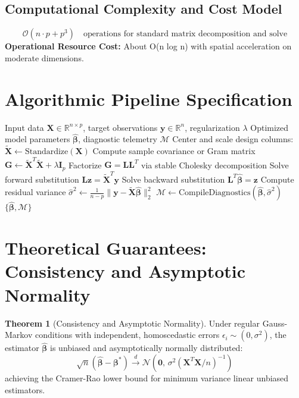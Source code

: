 \documentclass[11pt,a4paper]{article}
\theoremstyle{definition}
\newtheorem{theorem}{\textbf{Theorem}}[section]
\begin{document}
\subsection{Computational Complexity and Cost Model}
\begin{equation}
\mathcal{O}(n \cdot p + p^3) \quad \text{operations for standard matrix decomposition and solve}
\end{equation}
\textbf{Operational Resource Cost:} About O(n log n) with spatial acceleration on moderate dimensions.

\section{Algorithmic Pipeline Specification}

\begin{algorithm}[H]
\caption{HDBSCAN Execution}
\begin{algorithmic}[1]
\Require Input data $\mathbf{X} \in \mathbb{R}^{n \times p}$, target observations $\mathbf{y} \in \mathbb{R}^n$, regularization $\lambda$
\Ensure Optimized model parameters $\hat{\boldsymbol{\beta}}$, diagnostic telemetry $\mathcal{M}$
\State Center and scale design columns: $\tilde{\mathbf{X}} \gets \text{Standardize}(\mathbf{X})$
\State Compute sample covariance or Gram matrix $\mathbf{G} \gets \tilde{\mathbf{X}}^T \tilde{\mathbf{X}} + \lambda \mathbf{I}_p$
\State Factorize $\mathbf{G} = \mathbf{L} \mathbf{L}^T$ via stable Cholesky decomposition
\State Solve forward substitution $\mathbf{L} \mathbf{z} = \tilde{\mathbf{X}}^T \mathbf{y}$
\State Solve backward substitution $\mathbf{L}^T \hat{\boldsymbol{\beta}} = \mathbf{z}$
\State Compute residual variance $\hat{\sigma}^2 \gets \frac{1}{n - p} \| \mathbf{y} - \tilde{\mathbf{X}} \hat{\boldsymbol{\beta}} \|_2^2$
\State $\mathcal{M} \gets \text{CompileDiagnostics}(\hat{\boldsymbol{\beta}}, \hat{\sigma}^2)$
\State \Return $\{\hat{\boldsymbol{\beta}}, \mathcal{M}\}$
\end{algorithmic}
\end{algorithm}

\section{Theoretical Guarantees: Consistency and Asymptotic Normality}

\begin{theorem}[Consistency and Asymptotic Normality]
Under regular Gauss-Markov conditions with independent, homoscedastic errors $\epsilon_i \sim (0, \sigma^2)$, the estimator $\hat{\boldsymbol{\beta}}$ is unbiased and asymptotically normally distributed:
\begin{equation}
\sqrt{n}(\hat{\boldsymbol{\beta}} - \boldsymbol{\beta}^*) \xrightarrow{d} \mathcal{N}\left(\mathbf{0}, \, \sigma^2 (\mathbf{X}^T \mathbf{X} / n)^{-1}\right)
\end{equation}
achieving the Cramer-Rao lower bound for minimum variance linear unbiased estimators.
\end{theorem}
\end{document}
